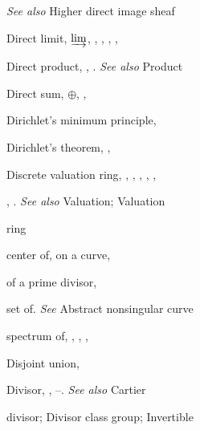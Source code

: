 {{\noindent\hspace*{15.0bp}\emph{See also} Higher direct image sheaf\par
\noindent\hspace*{0.0bp}Direct limit, $\varinjlim$, , , , , \par
\noindent\hspace*{0.0bp}Direct product, , . \emph{See also} Product\par
\noindent\hspace*{0.0bp}Direct sum, $\oplus$, , \par
\noindent\hspace*{0.0bp}Dirichlet's minimum principle, \par
\noindent\hspace*{0.0bp}Dirichlet's theorem, , \par
\noindent\hspace*{0.0bp}Discrete valuation ring, , , , , ,\par
\noindent\hspace*{15.0bp}, . \emph{See also} Valuation; Valuation\par
\noindent\hspace*{15.0bp}ring\par
\noindent\hspace*{7.5bp}center of, on a curve, \par
\noindent\hspace*{7.5bp}of a prime divisor, \par
\noindent\hspace*{7.5bp}set of. \emph{See} Abstract nonsingular curve\par
\noindent\hspace*{7.5bp}spectrum of, , , , \par
\noindent\hspace*{0.0bp}Disjoint union, \par
\noindent\hspace*{0.0bp}Divisor, , --. \emph{See also} Cartier\par
\noindent\hspace*{15.0bp}divisor; Divisor class group; Invertible\par
}}
